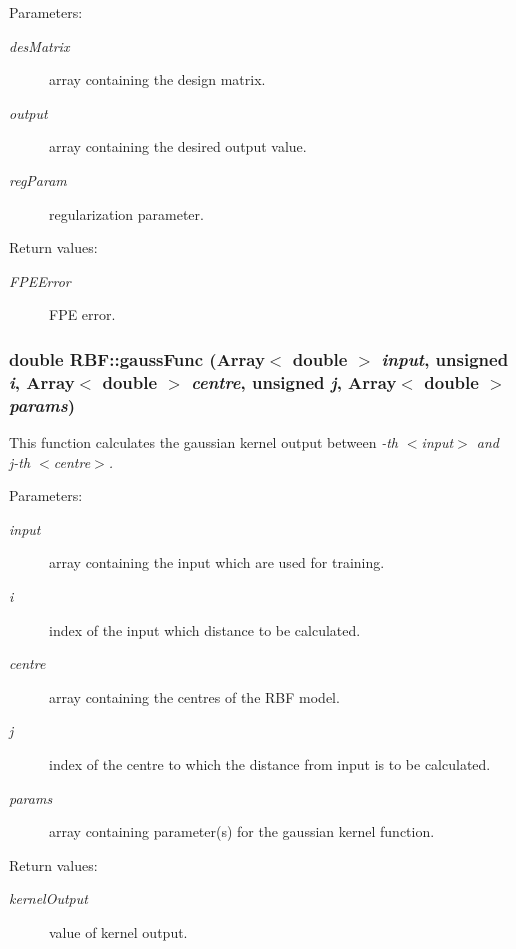\begin{Desc}
\item[Parameters:]
\begin{description}
\item[{\em des\-Matrix}]array containing the design matrix. \item[{\em output}]array containing the desired output value. \item[{\em reg\-Param}]regularization parameter. \end{description}
\end{Desc}
\begin{Desc}
\item[Return values:]
\begin{description}
\item[{\em FPEError}]FPE error.\end{description}
\end{Desc}
\subsubsection{\setlength{\rightskip}{0pt plus 5cm}double RBF::gauss\-Func (Array$<$ double $>$ {\em input}, unsigned {\em i}, Array$<$ double $>$ {\em centre}, unsigned {\em j}, Array$<$ double $>$ {\em params})\hspace{0.3cm}{\tt  [static]}}\label{classRBF_e1}


This function calculates the gaussian kernel output between {\em -th $<$input$>$ and j-th $<$centre$>$. \/}

\begin{Desc}
\item[Parameters:]
\begin{description}
\item[{\em input}]array containing the input which are used for training. \item[{\em i}]index of the input which distance to be calculated. \item[{\em centre}]array containing the centres of the RBF model. \item[{\em j}]index of the centre to which the distance from input is to be calculated. \item[{\em params}]array containing parameter(s) for the gaussian kernel function. \end{description}
\end{Desc}
\begin{Desc}
\item[Return values:]
\begin{description}
\item[{\em kernel\-Output}]value of kernel output.\end{description}
\end{Desc}
